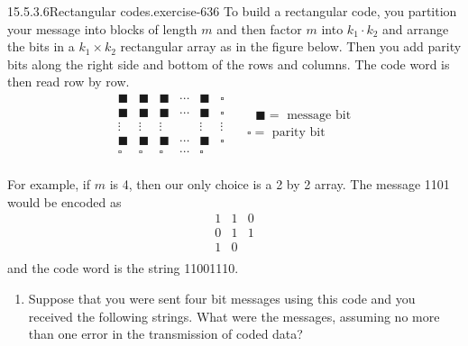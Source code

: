 \documentclass[twoside,10pt,]{book}
\numberwithin{equation}{section}
\begin{document}
\begin{divisionsolution}{15.5.3.6}{Rectangular codes.}{exercise-636}%
\hypertarget{p-5683}{}%
To build a rectangular code, you partition your message into blocks of length \(m\) and then factor \(m\) into \(k_1\cdot k_2\)  and arrange the bits in a  \(k_1 \times k_2\) rectangular array as in the figure below.  Then you add parity bits along the right side and bottom of the rows and columns.   The code word is then read row by row.%
\begin{equation*}
\begin{array}{cccccc}
\blacksquare  & \blacksquare  & \blacksquare  & \cdots  & \blacksquare  & \square  \\
\blacksquare  & \blacksquare  & \blacksquare  & \cdots  & \blacksquare  & \square  \\
\vdots  & \vdots  & \vdots  &   & \vdots  & \vdots  \\
\blacksquare  & \blacksquare  & \blacksquare  & \cdots  & \blacksquare  & \square  \\
\square  & \square  & \square  & \cdots  & \square  &   \\
\end{array}  \quad \begin{array}{c}
\textrm{      }\blacksquare  = \textrm{ message} \textrm{ bit} \\
\square  =\textrm{ parity} \textrm{ bit} \\
\end{array}
\end{equation*}
%
\par
\hypertarget{p-5684}{}%
For example, if \(m\) is 4, then our only choice is a 2 by 2 array.  The message 1101 would be encoded as%
\begin{equation*}
\begin{array}{cc|c}
1 & 1 & 0\\
0 & 1 & 1\\
\hline
1 & 0 &\\
\end{array}
\end{equation*}
and the code word is the string 11001110.%
\par
\hypertarget{p-5685}{}%
\leavevmode%
\begin{enumerate}[label=(\alph*)]
\item\hypertarget{li-2504}{}\hypertarget{p-5686}{}%
Suppose that you were sent four bit messages using this code and you received the following strings.  What were the messages, assuming no more than one error in the transmission of coded data?%

\end{enumerate}
\end{divisionsolution}
\end{document}

